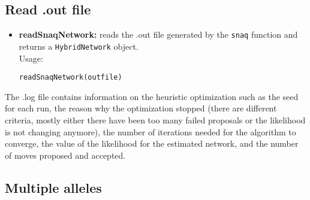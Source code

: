\documentclass[12pt]{article}
\begin{document}
\subsection{Read .out file}
\begin{itemize}
\item \textbf{readSnaqNetwork:} reads the .out file generated by the
  \texttt{snaq} function and returns a \texttt{HybridNetwork}
  object.\\
Usage:
\begin{lstlisting}
readSnaqNetwork(outfile)
\end{lstlisting}
\end{itemize}

The .log file contains information on the heuristic optimization
such as the seed for each run, the reason why the optimization stopped
(there are different criteria, mostly either there have been too many
failed proposals or the likelihood is not changing anymore), the
number of iterations needed for the algorithm to converge, the value
of the likelihood for the estimated network, and the
number of moves proposed and accepted.

\subsection{Multiple alleles}
\end{document}
